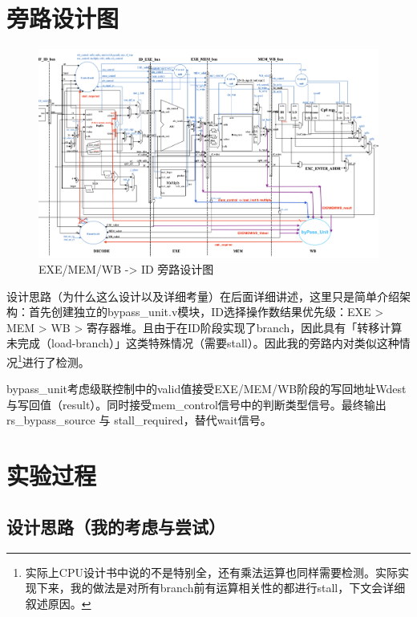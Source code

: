 \documentclass[a4paper]{article}
\begin{document}
\section{旁路设计图}

\begin{figure}[H]
    \hspace*{-0.9cm} %
    \includegraphics[width=1.1\linewidth]{img/旁路修改图片/旁路设计图.png}
    \caption{EXE/MEM/WB -> ID 旁路设计图}
\end{figure}

设计思路（为什么这么设计以及详细考量）在后面详细讲述，这里只是简单介绍架构：首先创建独立的bypass\_unit.v模块，ID选择操作数结果优先级：EXE > MEM > WB > 寄存器堆。且由于在ID阶段实现了branch，因此具有「转移计算未完成（load-branch）」这类特殊情况（需要stall）。因此我的旁路内对类似这种情况\footnote{实际上CPU设计书中说的不是特别全，还有乘法运算也同样需要检测。实际实现下来，我的做法是对所有branch前有运算相关性的都进行stall，下文会详细叙述原因。}进行了检测。

bypass\_unit考虑级联控制中的valid值接受EXE/MEM/WB阶段的写回地址Wdest与写回值（result）。同时接受mem\_control信号中的判断类型信号。最终输出rs\_bypass\_source 与 stall\_required，替代wait信号。

\newpage


\section{实验过程}

\subsection{设计思路（我的考虑与尝试）}
\end{document}
